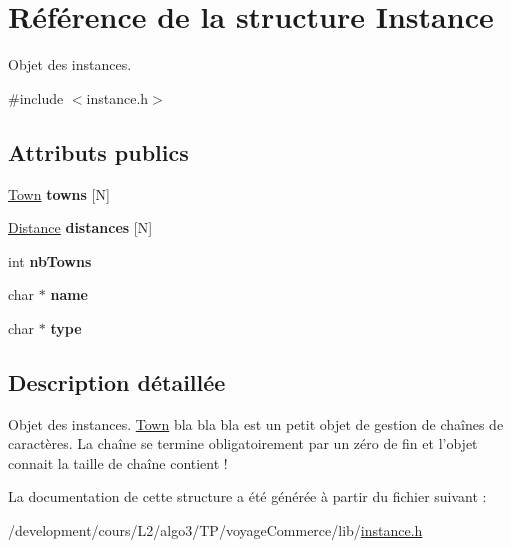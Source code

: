 \hypertarget{structInstance}{
\section{Référence de la structure Instance}
\label{structInstance}
}


Objet des instances.  




{\ttfamily \#include $<$instance.h$>$}

\subsection*{Attributs publics}
\begin{DoxyCompactItemize}
\item 
\hypertarget{structInstance_a2087c5ae925e10c023ab75ae949b3a8c}{
\hyperlink{structTown}{Town} {\bfseries towns} \mbox{[}N\mbox{]}}
\label{structInstance_a2087c5ae925e10c023ab75ae949b3a8c}

\item 
\hypertarget{structInstance_a4737b2c817f2a1d43e15c370dbdd10b2}{
\hyperlink{structDistance}{Distance} {\bfseries distances} \mbox{[}N\mbox{]}}
\label{structInstance_a4737b2c817f2a1d43e15c370dbdd10b2}

\item 
\hypertarget{structInstance_aef5e944d6f236c31f03a4a9886e8ab99}{
int {\bfseries nbTowns}}
\label{structInstance_aef5e944d6f236c31f03a4a9886e8ab99}

\item 
\hypertarget{structInstance_a7822b9a12232dac563bd744f399cae76}{
char $\ast$ {\bfseries name}}
\label{structInstance_a7822b9a12232dac563bd744f399cae76}

\item 
\hypertarget{structInstance_ab4e774f10f1088a089d356fda448f6d1}{
char $\ast$ {\bfseries type}}
\label{structInstance_ab4e774f10f1088a089d356fda448f6d1}

\end{DoxyCompactItemize}


\subsection{Description détaillée}
Objet des instances. \hyperlink{structTown}{Town} bla bla bla est un petit objet de gestion de chaînes de caractères. La chaîne se termine obligatoirement par un zéro de fin et l'objet connait la taille de chaîne contient ! 

La documentation de cette structure a été générée à partir du fichier suivant :\begin{DoxyCompactItemize}
\item 
/development/cours/L2/algo3/TP/voyageCommerce/lib/\hyperlink{instance_8h}{instance.h}\end{DoxyCompactItemize}
